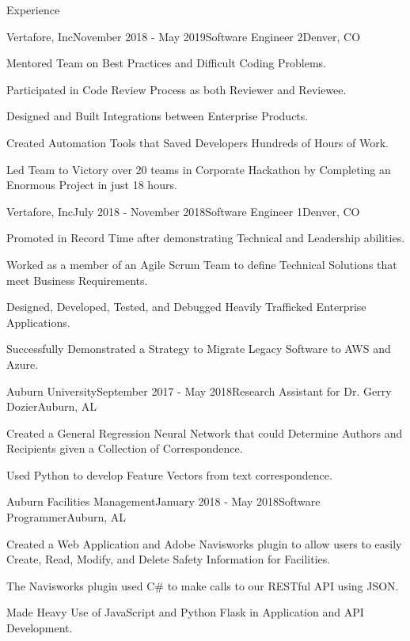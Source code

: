 \documentclass{resume} %
\begin{document}
\begin{rSection}{Experience}

\begin{rSubsection}{Vertafore, Inc}{November 2018 - May 2019}{Software Engineer 2}{Denver, CO}
\item Mentored Team on Best Practices and Difficult Coding Problems.
\item Participated in Code Review Process as both Reviewer and Reviewee. 
\item Designed and Built Integrations between Enterprise Products.
\item Created Automation Tools that Saved Developers Hundreds of Hours of Work. 
\item Led Team to Victory over 20 teams in Corporate Hackathon by Completing an Enormous Project in just 18 hours.
\end{rSubsection}

\begin{rSubsection}{Vertafore, Inc}{July 2018 - November 2018}{Software Engineer 1}{Denver, CO}
\item Promoted in Record Time after demonstrating Technical and Leadership abilities.
\item Worked as a member of an Agile Scrum Team to define Technical Solutions that meet Business Requirements. 
\item Designed, Developed, Tested, and Debugged Heavily Trafficked Enterprise Applications. 
\item Successfully Demonstrated a Strategy to Migrate Legacy Software to AWS and Azure. 
\end{rSubsection}


\begin{rSubsection}{Auburn University}{September 2017 - May 2018}{Research Assistant for Dr. Gerry Dozier}{Auburn, AL}
\item Created a General Regression Neural Network that could Determine Authors and Recipients given a Collection of Correspondence.
\item Used Python to develop Feature Vectors from text correspondence.
\end{rSubsection}


\begin{rSubsection}{Auburn Facilities Management}{January 2018 - May 2018}{Software Programmer}{Auburn, AL}
\item Created a Web Application and Adobe Navisworks plugin to allow users to easily Create, Read, Modify, and Delete Safety Information for Facilities.
\item The Navisworks plugin used C\# to make calls to our RESTful API using JSON.
\item Made Heavy Use of JavaScript and Python Flask in Application and API Development.
\end{rSubsection}

\end{rSection}
\end{document}

